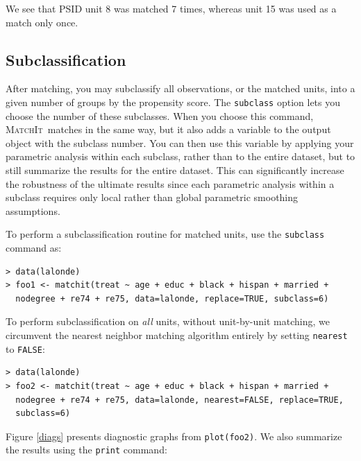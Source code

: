 \documentclass[oneside,letterpaper,titlepage]{article}
\newcommand{\MatchIt}{\textsc{MatchIt}}
\begin{document}
We see that PSID unit 8 was matched 7 times, whereas unit 15 was used
as a match only once.

\subsection{Subclassification}

After matching, you may subclassify all observations, or the matched
units, into a given number of groups by the propensity score.  The
\texttt{subclass} option lets you choose the number of these
subclasses.  When you choose this command, \MatchIt\ matches in the
same way, but it also adds a variable to the output object with the
subclass number.  You can then use this variable by applying your
parametric analysis within each subclass, rather than to the entire
dataset, but to still summarize the results for the entire dataset.
This can significantly increase the robustness of the ultimate results
since each parametric analysis within a subclass requires only local
rather than global parametric smoothing assumptions.

To perform a subclassification routine for matched units, use the
\texttt{subclass} command as:

\begin{verbatim}
> data(lalonde) 
> foo1 <- matchit(treat ~ age + educ + black + hispan + married +
  nodegree + re74 + re75, data=lalonde, replace=TRUE, subclass=6)
\end{verbatim}

To perform subclassification on \emph{all} units, without unit-by-unit
matching, we circumvent the nearest neighbor matching algorithm
entirely by setting \texttt{nearest} to \texttt{FALSE}:

\begin{verbatim}
> data(lalonde) 
> foo2 <- matchit(treat ~ age + educ + black + hispan + married +
  nodegree + re74 + re75, data=lalonde, nearest=FALSE, replace=TRUE,
  subclass=6)
\end{verbatim}

Figure \ref{diags} presents diagnostic graphs from \texttt{plot(foo2)}.  
We also summarize the results using the {\tt print} command:
\end{document}
